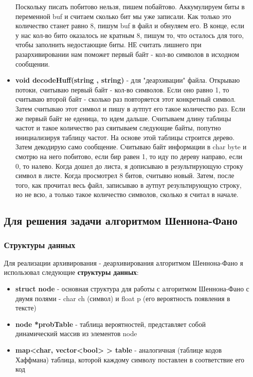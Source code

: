 \documentclass[a4paper, 12pt]{article}
\begin{document}
\begin{itemize}
  Поскольку писать побитово нельзя, пишем побайтово. Аккумулируем биты в переменной
  buf и считаем сколько бит мы уже записали.
  Как только это количество станет равно 8, пишум buf в файл и обнуляем его.
  В конце, если у нас кол-во бито оказалось не кратным 8,
  пишум то, что осталось для того, чтобы заполнить недостающие биты.
  НЕ считать лишнего при разархивировании нам поможет первый байт -
  кол-во символов в исходном сообщении.
  \item \textbf{void decodeHuff(string , string)} - для "деархивации" файла.
  Открываю потоки, считываю первый байт - кол-во символов. Если оно равно
  1, то считываю второй байт - сколько раз повторяется этот конкретный символ.
  Затем считываю этот символ и пишу в аутпут его такое
  количество раз. Если же первый байт не еденица, то идем дальше. Считываем
  длину таблицы частот и такое количество раз сяитываем
  следующие байты, попутно инициализируя таблицу частот. На основе этой таблицы
  строится дерево. Затем декодирую само сообщение.
  Считываю байт информации в char byte и смотрю на него побитово, если бир равен
  1, то иду по дереву направо, если 0, то налево.
  Когда дошел до листа, я дописываю в результирующую строку символ в листе.
  Когда просмотрел 8 битов, считывю новый.
  Затем, после того, как прочитал весь файл, записываю в аутпут результирующую
  строку, но не всю, а только такое количество символов,
  сколько я считал в начале.
\end{itemize}

\subsection{Для решения задачи алгоритмом Шеннона-Фано}
\subsubsection{Структуры данных}
Для реализации архивирования - деархивирования алгоритмом Шеннона-Фано я использовал
следующие \textbf{структуры данных}:
\begin{itemize}
  \item \textbf{struct node} - основная структура для работы с алгоритмом
  Шеннона-Фано с двумя полями - char ch (символ) и float p (его
  вероятность появления в тексте)
  \item \textbf{node *probTable} - таблица вероятностей, представляет собой
  динамический массив из элементов node
  \item \textbf{map<char, vector<bool> > table} - аналогичная (таблице кодов Хаффмана)
  таблица, которой каждому символу
  поставлен в соответствие его код
\end{itemize}
\end{document}
